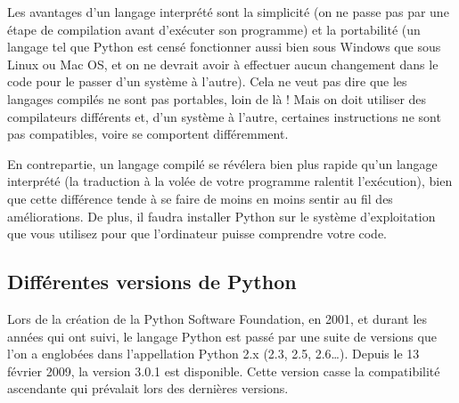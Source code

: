 \documentclass[11pt,oneside]{article}
\begin{document}
Les avantages d'un langage interprété sont la simplicité (on ne passe pas par une étape de compilation avant d'exécuter son programme) et la portabilité (un langage tel que Python est censé fonctionner aussi bien sous Windows que sous Linux ou Mac OS, et on ne devrait avoir à effectuer aucun changement dans le code pour le passer d'un système à l'autre). Cela ne veut pas dire que les langages compilés ne sont pas portables, loin de là ! Mais on doit utiliser des compilateurs différents et, d'un système à l'autre, certaines instructions ne sont pas compatibles, voire se comportent différemment.

En contrepartie, un langage compilé se révélera bien plus rapide qu'un langage interprété (la traduction à la volée de votre programme ralentit l'exécution), bien que cette différence tende à se faire de moins en moins sentir au fil des améliorations. De plus, il faudra installer Python sur le système d'exploitation que vous utilisez pour que l'ordinateur puisse comprendre votre code.

\subsection{Différentes versions de Python}

Lors de la création de la Python Software Foundation, en 2001, et durant les années qui ont suivi, le langage Python est passé par une suite de versions que l'on a englobées dans l'appellation Python 2.x (2.3, 2.5, 2.6…). Depuis le 13 février 2009, la version 3.0.1 est disponible. Cette version casse la compatibilité ascendante qui prévalait lors des dernières versions.







\begin{thebibliography}{2}
\end{thebibliography}
\end{document}
